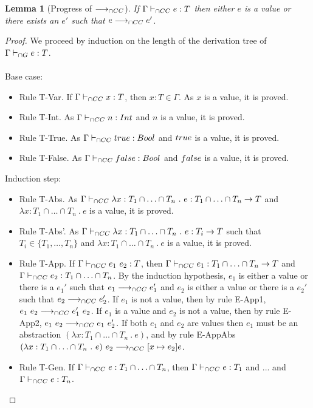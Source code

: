 \documentclass[a4paper]{article}
\newtheorem{lemma}{Lemma}
\begin{document}
\begin{lemma}[Progress of $\longrightarrow_{\cap CC}$]
\label{progress}
If $\Gamma \vdash_{\cap CC} e : T$ then either $e$ is a value or there exists an $e'$ such that $e \longrightarrow_{\cap CC} e'$.
\end{lemma}
\begin{proof}
We proceed by induction on the length of the derivation tree of $\Gamma \vdash_{\cap G} e : T$.\\\\
Base case:
\begin{itemize}
    \item Rule T-Var.
    If $\Gamma \vdash_{\cap CC} x : T$, then $x : T \in \Gamma$. As $x$ is a value, it is proved.
    \item Rule T-Int.
    As $\Gamma \vdash_{\cap CC} n : {Int}$ and $n$ is a value, it is proved.
    \item Rule T-True.
    As $\Gamma \vdash_{\cap CC} true : Bool$ and $true$ is a value, it is proved.
    \item Rule T-False.
    As $\Gamma \vdash_{\cap CC} false : Bool$ and $false$ is a value, it is proved.
\end{itemize}
Induction step:
\begin{itemize}
    \item Rule T-Abs.
    As $\Gamma \vdash_{\cap CC} \lambda x : T_1 \cap \ldots \cap T_n\ .\ e : T_1 \cap \ldots \cap T_n \rightarrow T$ and $\lambda x : T_1 \cap \ldots \cap T_n\ .\ e$ is a value, it is proved.
    \item Rule T-Abs'.
    As $\Gamma \vdash_{\cap CC} \lambda x : T_1 \cap \ldots \cap T_n\ .\ e : T_i \rightarrow T$ such that $T_i \in \{T_1, \ldots, T_n\}$ and $\lambda x : T_1 \cap \ldots \cap T_n\ .\ e$ is a value, it is proved.
    \item Rule T-App.
    If $\Gamma \vdash_{\cap CC} e_1\ e_2 : T$, then $\Gamma \vdash_{\cap CC} e_1 : T_1 \cap \ldots \cap T_n \rightarrow T$ and $\Gamma \vdash_{\cap CC} e_2 : T_1 \cap \ldots \cap T_n$.
    By the induction hypothesis, $e_1$ is either a value or there is a $e_1'$ such that $e_1 \longrightarrow_{\cap CC} e_1'$ and $e_2$ is either a value or there is a $e_2'$ such that $e_2 \longrightarrow_{\cap CC} e_2'$.
    If $e_1$ is not a value, then by rule E-App1, $e_1\ e_2 \longrightarrow_{\cap CC} e_1'\ e_2$.
    If $e_1$ is a value and $e_2$ is not a value, then by rule E-App2, $e_1\ e_2 \longrightarrow_{\cap CC} e_1\ e_2'$.
    If both $e_1$ and $e_2$ are values then $e_1$ must be an abstraction $(\lambda x : T_1 \cap \ldots \cap T_n\ .\ e)$, and by rule E-AppAbs $(\lambda x : T_1 \cap \ldots \cap T_n\ .\ e)\ e_2 \longrightarrow_{\cap CC} [x \mapsto e_2]e$.
    \item Rule T-Gen.
    If $\Gamma \vdash_{\cap CC} e : T_1 \cap \ldots \cap T_n$, then $\Gamma \vdash_{\cap CC} e : T_1$ and ... and $\Gamma \vdash_{\cap CC} e : T_n$.

\end{itemize}
\end{proof}
\end{document}
